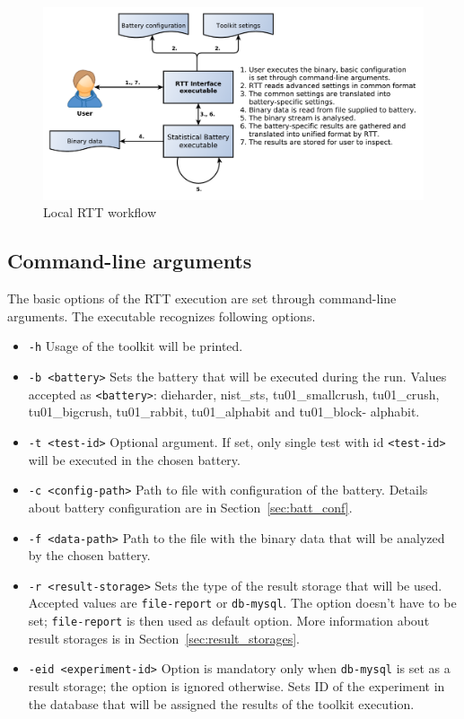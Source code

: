 \documentclass[
  digital,  	%
  color,		%
  oneside,   	%
  12pt,
  nocover,
  notable,
  nolof,
  nolot,
]{fithesis3}
\begin{document}
\begin{figure}[h!]
\begin{nomar}
\centering
\includegraphics[width=\paperwidth-4cm]{figures/local-rtt-workflow.pdf}
\end{nomar}
\caption{Local RTT workflow}
\label{fig:rtt_local_workflow}
\end{figure}

\subsection{Command-line arguments}
The basic options of the RTT execution are set through command-line arguments. The executable recognizes following options.

\begin{itemize}
\item \texttt{-h} Usage of the toolkit will be printed.
\item \texttt{-b <battery>} Sets the battery that will be executed during the run. Values accepted as \texttt{<battery>}: dieharder, nist\_sts, tu01\_smallcrush, tu01\_crush, tu01\_bigcrush, tu01\_rabbit, tu01\_alphabit and tu01\_block- \linebreak alphabit.
\item \texttt{-t <test-id>} Optional argument. If set, only single test with id \texttt{<test-id>} will be executed in the chosen battery.
\item \texttt{-c <config-path>} Path to file with configuration of the battery. Details about battery configuration are in Section~\ref{sec:batt_conf}.
\item \texttt{-f <data-path>} Path to the file with the binary data that will be analyzed by the chosen battery.
\item \texttt{-r <result-storage>} Sets the type of the result storage that will be used. Accepted values are \texttt{file-report} or \texttt{db-mysql}. The option doesn't have to be set; \texttt{file-report} is then used as default option. More information about result storages is in Section~\ref{sec:result_storages}.
\item \texttt{-eid <experiment-id>} Option is mandatory only when \texttt{db-mysql} is set as a result storage; the option is ignored otherwise. Sets ID of the experiment in the database that will be assigned the results of the toolkit execution.
\end{itemize}
\end{document}
